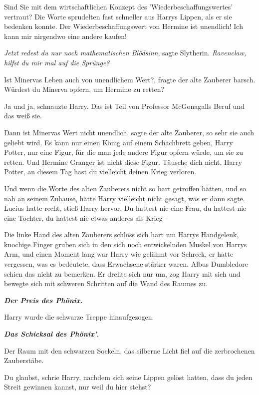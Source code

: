 \glqq{}Sind Sie mit dem wirtschaftlichen Konzept des 'Wiederbeschaffungswertes'
vertraut?\grqq{} Die Worte sprudelten fast schneller aus Harrys Lippen, als er
sie bedenken konnte. \glqq{}Der Wiederbeschaffungswert von Hermine ist unendlich!
Ich kann mir nirgendwo eine andere kaufen!\grqq{}

\emph{Jetzt redest du nur noch mathematischen Blödsinn}, sagte Slytherin.
\emph{Ravenclaw, hilfst du mir mal auf die Sprünge?}

\glqq{}Ist Minervas Leben auch von unendlichem Wert?\grqq{}, fragte der alte
Zauberer barsch. \glqq{}Würdest du Minerva opfern, um Hermine zu retten?\grqq{}

\glqq{}Ja und ja\grqq{}, schnauzte Harry. \glqq{}Das ist Teil von Professor
McGonagalls Beruf und das weiß sie.\grqq{}

\glqq{}Dann ist Minervas Wert nicht unendlich\grqq{}, sagte der alte Zauberer,
\glqq{}so sehr sie auch geliebt wird. Es kann nur einen König auf einem
Schachbrett geben, Harry Potter, nur eine Figur, für die man jede andere Figur
opfern würde, um sie zu retten. Und Hermine Granger ist nicht diese Figur.
Täusche dich nicht, Harry Potter, an diesem Tag hast du vielleicht deinen Krieg
verloren.\grqq{}

Und wenn die Worte des alten Zauberers nicht so hart getroffen hätten, und so
nah an seinem Zuhause, hätte Harry vielleicht nicht gesagt, was er dann sagte.
\glqq{}Lucius hatte recht\grqq{}, stieß Harry hervor. \glqq{}Du hattest nie eine
Frau, du hattest nie eine Tochter, du hattest nie etwas anderes als Krieg
-\grqq{}

Die linke Hand des alten Zauberers schloss sich hart um Harrys Handgelenk,
knochige Finger gruben sich in den sich noch entwickelnden Muskel von Harrys
Arm, und einen Moment lang war Harry wie gelähmt vor Schreck, er hatte
vergessen, was es bedeutete, dass Erwachsene stärker waren. Albus Dumbledore
schien das nicht zu bemerken. Er drehte sich nur um, zog Harry mit sich und
bewegte sich mit schweren Schritten auf die Wand des Raumes zu.

\glqq{}\textbf{\emph{Der Preis des Phönix.}}\grqq{}

Harry wurde die schwarze Treppe hinaufgezogen.

\glqq{}\textbf{\emph{Das Schicksal des Phönix'}}.\grqq{}

Der Raum mit den schwarzen Sockeln, das silberne Licht fiel auf die zerbrochenen
Zauberstäbe.

\glqq{}Du glaubst\grqq{}, schrie Harry, nachdem sich seine Lippen gelöst hatten,
\glqq{}dass du jeden Streit gewinnen kannst, nur weil du hier stehst?\grqq{}

